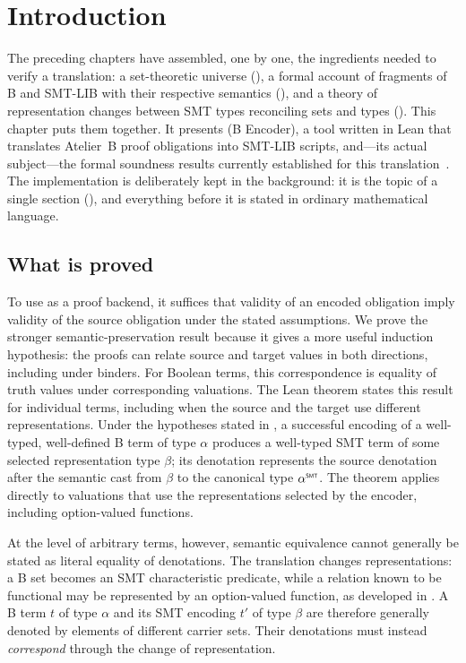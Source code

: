 \section{Introduction}
\label{sec:beer-introduction}

The preceding chapters have assembled, one by one, the ingredients needed to verify a translation: a set-theoretic universe (), a formal account of fragments of B and SMT-LIB with their respective semantics (), and a theory of representation changes between SMT types reconciling sets and types ().
This chapter puts them together.
It presents \beer{} (B Encoder), a tool written in Lean that translates Atelier~B proof obligations into SMT-LIB scripts, and---its actual subject---the formal soundness results currently established for this translation~\cite{trelat2025beer}.
The implementation is deliberately kept in the background: it is the topic of a single section (), and everything before it is stated in ordinary mathematical language.

\subsection{What is proved}
\label{sec:beer-goal}

To use \beer{} as a proof backend, it suffices that validity of an encoded obligation imply validity of the source obligation under the stated assumptions.
We prove the stronger semantic-preservation result because it gives a more useful induction hypothesis: the proofs can relate source and target values in both directions, including under binders.
For Boolean terms, this correspondence is equality of truth values under corresponding valuations.
The Lean theorem states this result for individual terms, including when the source and the target use different representations.
Under the hypotheses stated in , a successful encoding of a well-typed, well-defined B term of type \(\alpha\) produces a well-typed SMT term of some selected representation type \(\beta\); its denotation represents the source denotation after the semantic cast from \(\beta\) to the canonical type \(\toSMT{\alpha}\).
The theorem applies directly to valuations that use the representations selected by the encoder, including option-valued functions.

At the level of arbitrary terms, however, semantic equivalence cannot generally be stated as literal equality of denotations.
The translation changes representations: a B set becomes an SMT characteristic predicate, while a relation known to be functional may be represented by an option-valued function, as developed in .
A B term \(t\) of type \(\alpha\) and its SMT encoding \(t'\) of type \(\beta\) are therefore generally denoted by elements of different carrier sets.
Their denotations must instead \emph{correspond} through the change of representation.

